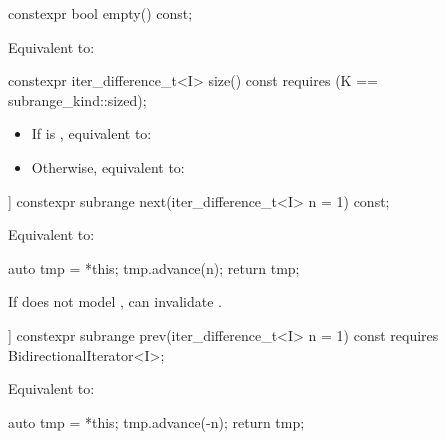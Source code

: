 %
\begin{itemdecl}
constexpr bool empty() const;
\end{itemdecl}

\begin{itemdescr}
\pnum
\effects Equivalent to: 
\end{itemdescr}

%
\begin{itemdecl}
constexpr iter_difference_t<I> size() const
  requires (K == subrange_kind::sized);
\end{itemdecl}

\begin{itemdescr}
\pnum
\effects
\begin{itemize}
\item If  is , equivalent to: 
\item Otherwise, equivalent to: 
\end{itemize}
\end{itemdescr}

%
\begin{itemdecl}
[[nodiscard]] constexpr subrange next(iter_difference_t<I> n = 1) const;
\end{itemdecl}

\begin{itemdescr}
\pnum
\effects Equivalent to:
\begin{codeblock}
auto tmp = *this;
tmp.advance(n);
return tmp;
\end{codeblock}

\pnum
\begin{note}
If  does not model , 
can invalidate .
\end{note}
\end{itemdescr}

%
\begin{itemdecl}
[[nodiscard]] constexpr subrange prev(iter_difference_t<I> n = 1) const
  requires BidirectionalIterator<I>;
\end{itemdecl}

\begin{itemdescr}
\pnum
\effects Equivalent to:
\begin{codeblock}
auto tmp = *this;
tmp.advance(-n);
return tmp;
\end{codeblock}
\end{itemdescr}

